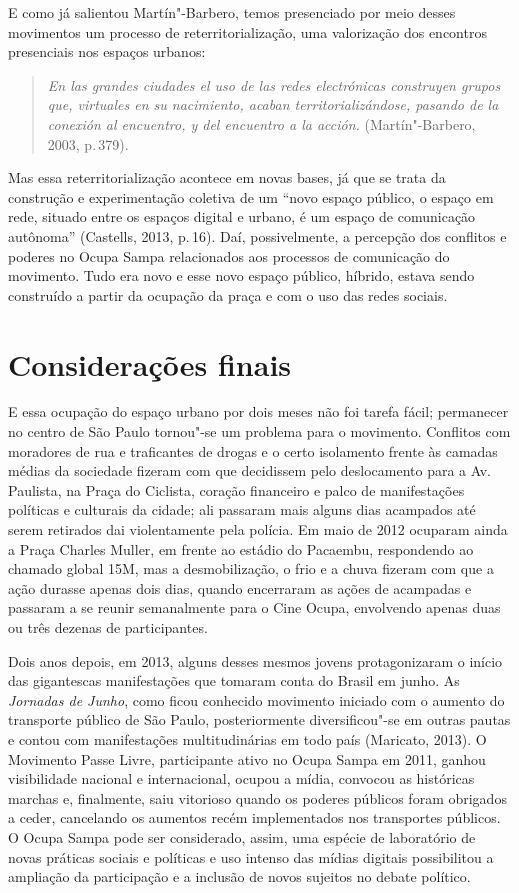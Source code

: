 E como já salientou Martín"-Barbero, temos presenciado por meio desses
movimentos um processo de reterritorialização, uma valorização dos
encontros presenciais nos espaços urbanos:

\begin{quote}
\emph{En las grandes ciudades el uso de las redes electrónicas
construyen grupos que, virtuales en su nacimiento, acaban
territorializándose, pasando de la conexión al encuentro, y del
encuentro a la acción.} (Martín"-Barbero, 2003, p.\,379).
\end{quote}

Mas essa reterritorialização acontece em novas bases, já que se trata da
construção e experimentação coletiva de um ``novo espaço público, o
espaço em rede, situado entre os espaços digital e urbano, é um espaço
de comunicação autônoma'' (Castells, 2013, p.\,16). Daí, possivelmente, a
percepção dos conflitos e poderes no Ocupa Sampa relacionados aos
processos de comunicação do movimento. Tudo era novo e esse novo espaço
público, híbrido, estava sendo construído a partir da ocupação da praça
e com o uso das redes sociais.

\section{Considerações finais}

E essa ocupação do espaço urbano por dois meses não foi tarefa fácil;
permanecer no centro de São Paulo tornou"-se um problema para o
movimento. Conflitos com moradores de rua e traficantes de drogas e o
certo isolamento frente às camadas médias da sociedade fizeram com que
decidissem pelo deslocamento para a Av. Paulista, na Praça do Ciclista,
coração financeiro e palco de manifestações políticas e culturais da
cidade; ali passaram mais alguns dias acampados até serem retirados dai
violentamente pela polícia. Em maio de 2012 ocuparam ainda a Praça
Charles Muller, em frente ao estádio do Pacaembu, respondendo ao chamado
global 15M, mas a desmobilização, o frio e a chuva fizeram com que a
ação durasse apenas dois dias, quando encerraram as ações de acampadas e
passaram a se reunir semanalmente para o Cine Ocupa, envolvendo apenas
duas ou três dezenas de participantes.

Dois anos depois, em 2013, alguns desses mesmos jovens
protagonizaram o início das gigantescas manifestações que tomaram conta
do Brasil em junho. As \emph{Jornadas de Junho}, como ficou conhecido
movimento iniciado com o aumento do transporte público de São Paulo,
posteriormente diversificou"-se em outras pautas e contou com
manifestações multitudinárias em todo país (Maricato, 2013). O Movimento
Passe Livre, participante ativo no Ocupa Sampa em 2011, ganhou
visibilidade nacional e internacional, ocupou a mídia, convocou as
históricas marchas e, finalmente, saiu vitorioso quando os poderes
públicos foram obrigados a ceder, cancelando os aumentos recém
implementados nos transportes públicos. O Ocupa Sampa pode ser
considerado, assim, uma espécie de laboratório de novas práticas sociais
e políticas e uso intenso das mídias digitais possibilitou a ampliação
da participação e a inclusão de novos sujeitos no debate político.

